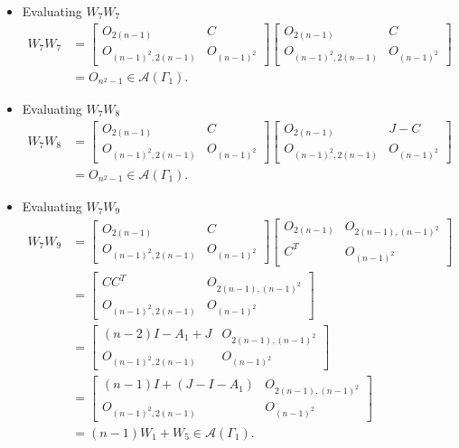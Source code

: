 \begin{itemize}
    \item Evaluating $W_7W_7$
    \begin{align*}
        W_7W_7
        &= \begin{bmatrix}
            O_{2(n-1)} & C \\
            O_{(n-1)^2, 2(n-1)} & O_{(n-1)^2}
        \end{bmatrix}\begin{bmatrix}
            O_{2(n-1)} & C \\
            O_{(n-1)^2, 2(n-1)} & O_{(n-1)^2}
        \end{bmatrix}\\
        &= O_{n^2-1}\in\mathcal{A}(\Gamma_1).
    \end{align*}
    
    \item Evaluating $W_7W_8$
    \begin{align*}
        W_7W_8
        &= \begin{bmatrix}
            O_{2(n-1)} & C \\
            O_{(n-1)^2, 2(n-1)} & O_{(n-1)^2}
        \end{bmatrix}\begin{bmatrix}
            O_{2(n-1)} & J-C \\
            O_{(n-1)^2, 2(n-1)} & O_{(n-1)^2}
        \end{bmatrix}\\
        &= O_{n^2-1}\in\mathcal{A}(\Gamma_1).
    \end{align*}
    
    \item Evaluating $W_7W_9$
    \begin{align*}
        W_7W_9
        &= \begin{bmatrix}
            O_{2(n-1)} & C \\
            O_{(n-1)^2, 2(n-1)} & O_{(n-1)^2}
        \end{bmatrix}\begin{bmatrix}
            O_{2(n-1)} & O_{2(n-1),(n-1)^2} \\
            C^T & O_{(n-1)^2}
        \end{bmatrix}\\
        &= \begin{bmatrix}
            CC^T & O_{2(n-1),(n-1)^2} \\
            O_{(n-1)^2, 2(n-1)} & O_{(n-1)^2}
        \end{bmatrix}\\
        &= \begin{bmatrix}
            (n-2)I - A_1 + J & O_{2(n-1),(n-1)^2} \\
            O_{(n-1)^2, 2(n-1)} & O_{(n-1)^2}
        \end{bmatrix}\\
        &= \begin{bmatrix}
            (n-1)I + (J-I-A_1) & O_{2(n-1),(n-1)^2} \\
            O_{(n-1)^2, 2(n-1)} & O_{(n-1)^2}
        \end{bmatrix}\\
        &= (n-1)W_1 + W_5\in\mathcal{A}(\Gamma_1).
    \end{align*}
    

\end{itemize}
